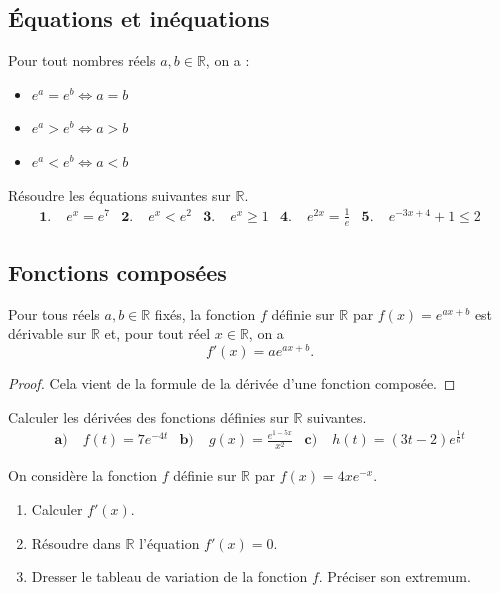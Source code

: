 \documentclass[11pt]{article}
\begin{document}
\subsection{Équations et inéquations}
\begin{prop}
  Pour tout nombres réels $a,b\in\mathbb{R}$, on a :
  \begin{itemize}
    \item $e^a = e^b \Leftrightarrow a=b$
    \item $e^a > e^b \Leftrightarrow a>b$
    \item $e^a < e^b \Leftrightarrow a<b$
  \end{itemize}
\end{prop}
\begin{app}
  Résoudre les équations suivantes sur $\mathbb{R}$.
  \begin{align*}
    \textbf{1.}\;& e^x = e^7 &
    \textbf{2.}\;& e^x < e^2 &
    \textbf{3.}\;& e^x\geq 1 &
    \textbf{4.}\;& e^{2x}= \frac{1}{e} &
    \textbf{5.}\;& e^{-3x+4}+1\leq2
  \end{align*}
\end{app}

\subsection{Fonctions composées}
\begin{prop}
  Pour tous réels $a,b\in\mathbb{R}$ fixés, la fonction $f$ définie sur
  $\mathbb{R}$ par
  \(
    f(x) = e^{ax+b}
  \)
  est dérivable sur $\mathbb{R}$ et, pour tout réel $x\in\mathbb{R}$, on a
  \[
    f'(x) = ae^{ax+b}.
  \]
\end{prop}
\begin{proof}
  Cela vient de la formule de la dérivée d'une fonction composée.
\end{proof}

\begin{app}
  Calculer les dérivées des fonctions définies sur $\mathbb{R}$ suivantes.
  \begin{align*}
    \textbf{a)}\;& f(t) = 7e^{-4t} &
    \textbf{b)}\;& g(x) = \frac{e^{1-5x}}{x^2} &
    \textbf{c)}\;& h(t) = (3t-2)e^{\frac{1}{6}t} 
  \end{align*}
\end{app}

\begin{app}
  On considère la fonction $f$ définie sur $\mathbb{R}$ par $f(x)=4xe^{-x}$.
  \begin{enumerate}
    \item Calculer $f'(x)$.
    \item Résoudre dans $\mathbb{R}$ l'équation $f'(x)=0$.
    \item Dresser le tableau de variation de la fonction $f$. Préciser son
      extremum.
  \end{enumerate}
\end{app}
\end{document}
